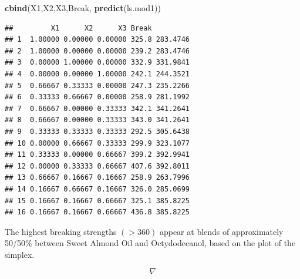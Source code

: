 \documentclass[
]{book}
\newenvironment{Shaded}{\begin{snugshade}}{\end{snugshade}}
\newcommand{\FunctionTok}[1]{\textcolor[rgb]{0.13,0.29,0.53}{\textbf{#1}}}
\newcommand{\NormalTok}[1]{#1}
\begin{document}
\begin{Shaded}
\begin{Highlighting}[]
\FunctionTok{cbind}\NormalTok{(X1,X2,X3,Break, }\FunctionTok{predict}\NormalTok{(ls.mod1))}
\end{Highlighting}
\end{Shaded}

\begin{verbatim}
##         X1      X2      X3 Break         
## 1  1.00000 0.00000 0.00000 325.8 283.4746
## 2  1.00000 0.00000 0.00000 239.2 283.4746
## 3  0.00000 1.00000 0.00000 332.9 331.9841
## 4  0.00000 0.00000 1.00000 242.1 244.3521
## 5  0.66667 0.33333 0.00000 247.3 235.2266
## 6  0.33333 0.66667 0.00000 258.9 281.1992
## 7  0.66667 0.00000 0.33333 342.1 341.2641
## 8  0.66667 0.00000 0.33333 343.0 341.2641
## 9  0.33333 0.33333 0.33333 292.5 305.6438
## 10 0.00000 0.66667 0.33333 299.9 323.1077
## 11 0.33333 0.00000 0.66667 399.2 392.9941
## 12 0.00000 0.33333 0.66667 407.6 392.8011
## 13 0.66667 0.16667 0.16667 258.9 263.7996
## 14 0.16667 0.66667 0.16667 326.0 285.0699
## 15 0.16667 0.16667 0.66667 325.1 385.8225
## 16 0.16667 0.16667 0.66667 436.8 385.8225
\end{verbatim}

The highest breaking strengths \((>360)\) appear at blends of
approximately 50/50\% between Sweet Almond Oil and Octydodecanol, based
on the plot of the simplex.

\[\nabla \]
\end{document}
